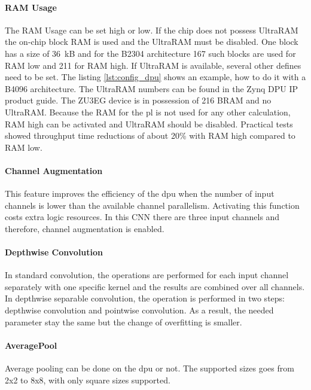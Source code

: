 \paragraph{RAM Usage}
The RAM Usage can be set high or low.
If the chip does not possess UltraRAM the on-chip block RAM is used and the UltraRAM must be disabled.
One block has a size of \SI{36}{kB} and for the B2304 architecture 167 such blocks are used for RAM low and 211 for RAM high.
If UltraRAM is available, several other defines need to be set.
The listing \ref{lst:config_dpu} shows an example, how to do it with a B4096 architecture.
The UltraRAM numbers can be found in the Zynq DPU IP product guide.
The ZU3EG device is in possession of 216 BRAM and no UltraRAM.
Because the RAM for the \acrshort{pl} is not used for any other calculation, RAM high can be activated and UltraRAM should be disabled.
Practical tests showed throughput time reductions of about 20\% with RAM high compared to RAM low.

\paragraph{Channel Augmentation}
This feature improves the efficiency of the \acrshort{dpu} when the number of input channels is lower than the available channel parallelism.
Activating this function costs extra logic resources.
In this CNN there are three input channels and therefore, channel augmentation is enabled.

\paragraph{Depthwise Convolution}
In standard convolution, the operations are performed for each input channel separately with one specific kernel and the results are combined over all channels.
In depthwise separable convolution, the operation is performed in two steps: depthwise convolution and pointwise convolution.
As a result, the needed parameter stay the same but the change of overfitting is smaller.

\paragraph{AveragePool}
Average pooling can be done on the \acrshort{dpu} or not.
The supported sizes goes from 2x2 to 8x8, with only square sizes supported.

